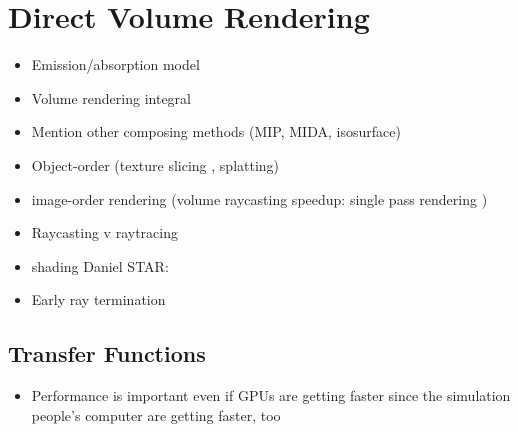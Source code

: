\section{Direct Volume Rendering}
\begin{itemize}
    \item Emission/absorption model \cite{sabella1988rendering}
    \item Volume rendering integral \cite{max1995optical}
    \item Mention other composing methods (MIP, MIDA, isosurface)
    \item Object-order (texture slicing \cite{westermann1998efficiently}, splatting\cite{westover1990footprint})
    \item image-order rendering (volume raycasting \cite{levoy1988display, drebin1988volume,sabella1988rendering} speedup: \cite{kruger2003acceleration} single pass rendering \cite{hadwiger2005real, stegmaier2005simple})
    \item Raycasting v raytracing
    \item shading \cite{phong1975illumination} Daniel STAR: \cite{jonsson14survey}
    \item Early ray termination \cite{levoy1990efficient}
\end{itemize}

\subsection{Transfer Functions}



\begin{itemize}
\item Performance is important even if GPUs are getting faster since the simulation people's computer are getting faster, too
\end{itemize}
